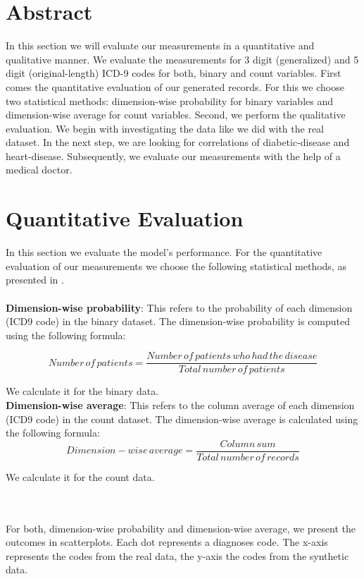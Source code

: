 \documentclass[11pt, a4paper, oneside]{book}
\begin{document}
\section{Abstract}
In this section we will evaluate our measurements in a quantitative and qualitative manner. We evaluate the measurements for 3 digit (generalized) and 5 digit (original-length) ICD-9 codes for both, binary and count variables.
First comes the quantitative evaluation of our generated records. For this we choose two statistical methods: dimension-wise probability for binary variables and dimension-wise average for count variables.
Second, we perform the qualitative evaluation. We begin with investigating the data like we did with the real dataset. In the next step, we are looking for correlations of diabetic-disease and heart-disease. Subsequently, we evaluate our measurements with the help of a medical doctor.

\section{Quantitative Evaluation}
In this section we evaluate the model's performance. For the quantitative evaluation of our measurements we choose the following statistical methods, as presented in \citep{Choi2017}.
\\
\\
\textbf{Dimension-wise probability}: This refers to the probability of each dimension (ICD9 code) in the binary dataset. The dimension-wise probability is computed using the following formula: 

\begin{equation}
Number\,of\,patients = \frac{Number\,of\,patients\, who \,had \,the \,disease}{Total \,number \,of \,patients}
\end{equation}

We calculate it for the binary data.
\\

\textbf{Dimension-wise average}: This refers to the column average of each dimension (ICD9 code) in the count dataset. The dimension-wise average is calculated using the following formula: 
\begin{equation}
Dimension-wise\,average = \frac{Column \,sum}{Total \,number \,of \,records}
\end{equation}

We calculate it for the count data.

\\
\\
For both, dimension-wise probability and dimension-wise average, we present the outcomes in scatterplots. Each dot represents a diagnoses code. The x-axis represents the codes from the real data, the y-axis the codes from the synthetic data.
\\
\\
\end{document}
